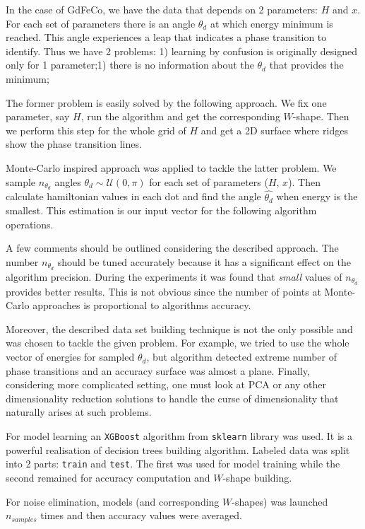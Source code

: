 In the case of GdFeCo, we have the data that depends on 2 parameters: $H$ and $x$.
For each set of parameters there is an angle $\theta_d$ at which energy minimum is reached.
This angle experiences a leap that indicates a phase transition to identify.
Thus we have 2 problems: 1) learning by confusion is originally designed only for 1 parameter;1) there is no information about the $\theta_d$ that provides the minimum;

The former problem is easily solved by the following approach.
We fix one parameter, say $H$, run the algorithm and get the corresponding $W$-shape.
Then we perform this step for the whole grid of $H$ and get a 2D surface where ridges show the phase transition lines.

Monte-Carlo inspired approach was applied to tackle the latter problem.
We sample $n_{\theta_d}$ angles $\theta_d \sim \mathcal{U}(0, \pi)$ for each set of parameters ($H$, $x$).
Then calculate hamiltonian values in each dot and find the angle $\hat{\theta_d}$ when energy is the smallest.
This estimation is our input vector for the following algorithm operations.

A few comments should be outlined considering the described approach.
The number $n_{\theta_d}$ should be tuned accurately because it has a significant effect on the algorithm precision.
During the experiments it was found that \textit{small} values of $n_{\theta_d}$ provides better results.
This is not obvious since the number of points at Monte-Carlo approaches is proportional to algorithms accuracy.

Moreover, the described data set building technique is not the only possible and was chosen to tackle the given problem.
For example, we tried to use the whole vector of energies for sampled $\theta_d$, but algorithm detected extreme number of phase transitions and an accuracy surface was almost a plane.
Finally, considering more complicated setting, one must look at PCA or any other dimensionality reduction solutions to handle the curse of dimensionality that naturally arises at such problems.


For model learning an \texttt{XGBoost} algorithm from \texttt{sklearn} library was used.
It is a powerful realisation of decision trees building algorithm.
Labeled data was split into 2 parts: \texttt{train} and \texttt{test}.
The first was used for model training while the second remained for accuracy computation and $W$-shape building.

For noise elimination, models (and corresponding $W$-shapes) was launched $n_{samples}$ times and then accuracy values were averaged.


